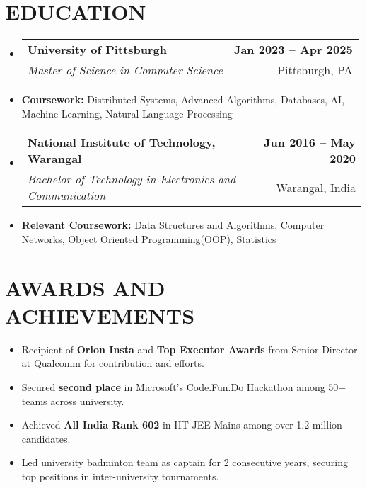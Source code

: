 \documentclass[letterpaper,10.9pt]{article}
\makeatletter
\newcommand{\resumeItem}[1]{
  \item\small{
    {#1 \vspace{-2pt}}
  }
}
\newcommand{\resumeEducationheading}[4]{
\item
    \begin{tabular*}{1.0\textwidth}[t]{l@{\extracolsep{\fill}}r}
      \hspace{-1pt}\textbf{ \small #1} & \textbf{\small #2} \\
      \textit{\small #3} & {\small #4} \\
    \end{tabular*}\vspace{-7pt}
}
\newcommand{\resumeSubSubheading}[2]{
    \vspace{-2pt}\item
    \begin{tabular*}{1.0\textwidth}{l@{\extracolsep{\fill}}r}
      \textit{#1} & \textit{#2} \\
    \end{tabular*}\vspace{-7pt}
}
\newcommand{\resumeSubHeadingListStart}{\begin{itemize}[leftmargin=0.0in, label={}]}
\newcommand{\resumeSubHeadingListEnd}{\end{itemize}}
\newcommand{\resumeItemListStart}{\begin{itemize}}
\newcommand{\resumeItemListEnd}{\end{itemize}\vspace{-7pt}}
\makeatother
\begin{document}
\section{EDUCATION} 
    \resumeSubHeadingListStart
        \resumeEducationheading
            {University of Pittsburgh}{Jan 2023 -- Apr 2025}
            {Master of Science in Computer Science}{Pittsburgh, PA}
            \resumeItem{\textbf{Coursework:} Distributed Systems, Advanced Algorithms, Databases, AI, Machine Learning, Natural Language Processing} 
        \resumeEducationheading
            {National Institute of Technology, Warangal}{Jun 2016 -- May 2020}
            {Bachelor of Technology in Electronics and Communication }{Warangal, India}
            \resumeItem{\textbf{Relevant Coursework:} Data Structures and Algorithms, Computer Networks, Object Oriented Programming(OOP), Statistics}
    \resumeSubHeadingListEnd


\section{AWARDS AND ACHIEVEMENTS}
\resumeSubHeadingListStart
    \resumeItemListStart      
        	\resumeItem{Recipient of \textbf{Orion Insta} and \textbf{Top Executor Awards} from Senior Director at Qualcomm for contribution and efforts.}
            
             \resumeItem{Secured \textbf{second place }in Microsoft's Code.Fun.Do Hackathon among 50+ teams across university.}
             
            \resumeItem{Achieved \textbf{All India Rank 602} in IIT-JEE  Mains among over 1.2 million candidates. }

            \resumeItem{Led university badminton team as captain for 2 consecutive years, securing top positions in inter-university tournaments.}
    \resumeItemListEnd
\resumeSubHeadingListEnd
            
  
\end{document}
